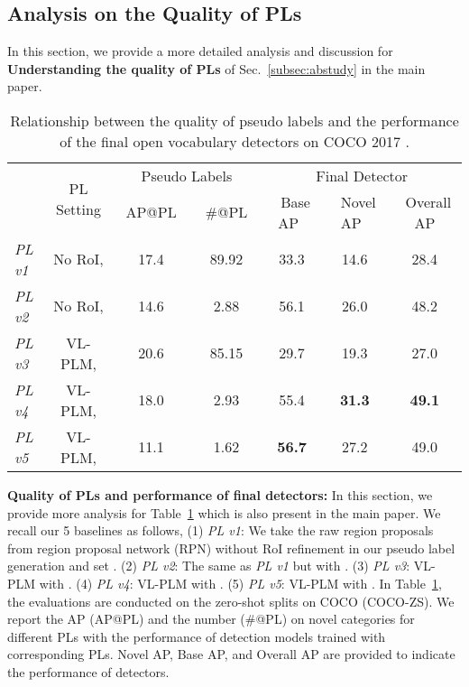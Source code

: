 \documentclass[runningheads]{llncs}
\begin{document}
\subsection{Analysis on the Quality of PLs} \label{subsec:quality_PL}
In this section, we provide a more detailed analysis and discussion for {\bf Understanding the quality of PLs} of Sec.~\ref{subsec:abstudy} in the main paper.

\begin{table}[tb]
\begin{center}
\caption{Relationship between the quality of pseudo labels and the performance of the final open vocabulary detectors on COCO 2017 \cite{COCO}.}
\label{tab:sup_PL_quality_vs_detector}
\begin{tabular}{l|c|cc|c c c}
\toprule
      & \multirow{2}{*}{PL Setting} & \multicolumn{2}{|c}{Pseudo Labels} & \multicolumn{3}{|c}{Final Detector} \\
\cline{3-7}
      &  & \ AP@PL\  & \ \#@PL\  & \ Base AP\  &\  Novel AP\  & \ Overall AP \\
\hline
\emph{PL v1} & No RoI,  & 17.4 & 89.92 & 33.3 & 14.6 & 28.4 \\
\emph{PL v2} & No RoI,  & 14.6 & 2.88 & 56.1 & 26.0 & 48.2 \\
\hline
\emph{PL v3} & VL-PLM,  & 20.6 & 85.15 & 29.7 & 19.3 & 27.0 \\
\emph{PL v4} & VL-PLM,  & 18.0 & {2.93} & 55.4 & \bf{31.3} & \bf{49.1} \\
\emph{PL v5} & VL-PLM,  & 11.1 & 1.62 & \bf{56.7} & 27.2 & 49.0 \\
\bottomrule
\end{tabular}
\end{center}
\end{table}


\vspace{1mm}
\noindent \textbf{Quality of PLs and performance of final detectors:} 
In this section, we provide more analysis for Table~\ref{tab:sup_PL_quality_vs_detector} which is also present in the main paper. We recall our 5 baselines as follows, 
(1) \emph{PL v1}: We take the raw region proposals from region proposal network (RPN) without RoI refinement in our pseudo label generation and set . 
(2) \emph{PL v2}: The same as \emph{PL v1} but with . 
(3) \emph{PL v3}: VL-PLM with . 
(4) \emph{PL v4}: VL-PLM with . 
(5) \emph{PL v5}: VL-PLM with . 
In Table~\ref{tab:sup_PL_quality_vs_detector}, the evaluations are conducted on the zero-shot splits \cite{bansal2018zero} on COCO \cite{COCO} (COCO-ZS). We report the AP (AP@PL) and the number (\#@PL) on novel categories for different PLs with the performance of detection models trained with corresponding PLs. Novel AP, Base AP, and Overall AP are provided to indicate the performance of detectors. 
\end{document}
